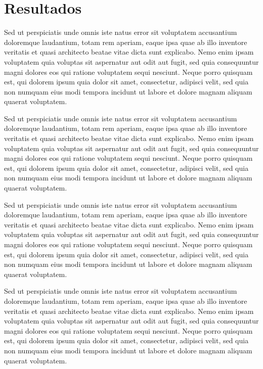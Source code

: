 \chapter{Resultados}


Sed ut perspiciatis unde omnis iste natus error sit voluptatem accusantium doloremque laudantium, totam rem aperiam, eaque ipsa quae ab illo inventore veritatis et quasi architecto beatae vitae dicta sunt explicabo. Nemo enim ipsam voluptatem quia voluptas sit aspernatur aut odit aut fugit, sed quia consequuntur magni dolores eos qui ratione voluptatem sequi nesciunt. Neque porro quisquam est, qui dolorem ipsum quia dolor sit amet, consectetur, adipisci velit, sed quia non numquam eius modi tempora incidunt ut labore et dolore magnam aliquam quaerat voluptatem.

Sed ut perspiciatis unde omnis iste natus error sit voluptatem accusantium doloremque laudantium, totam rem aperiam, eaque ipsa quae ab illo inventore veritatis et quasi architecto beatae vitae dicta sunt explicabo. Nemo enim ipsam voluptatem quia voluptas sit aspernatur aut odit aut fugit, sed quia consequuntur magni dolores eos qui ratione voluptatem sequi nesciunt. Neque porro quisquam est, qui dolorem ipsum quia dolor sit amet, consectetur, adipisci velit, sed quia non numquam eius modi tempora incidunt ut labore et dolore magnam aliquam quaerat voluptatem.

Sed ut perspiciatis unde omnis iste natus error sit voluptatem accusantium doloremque laudantium, totam rem aperiam, eaque ipsa quae ab illo inventore veritatis et quasi architecto beatae vitae dicta sunt explicabo. Nemo enim ipsam voluptatem quia voluptas sit aspernatur aut odit aut fugit, sed quia consequuntur magni dolores eos qui ratione voluptatem sequi nesciunt. Neque porro quisquam est, qui dolorem ipsum quia dolor sit amet, consectetur, adipisci velit, sed quia non numquam eius modi tempora incidunt ut labore et dolore magnam aliquam quaerat voluptatem.

Sed ut perspiciatis unde omnis iste natus error sit voluptatem accusantium doloremque laudantium, totam rem aperiam, eaque ipsa quae ab illo inventore veritatis et quasi architecto beatae vitae dicta sunt explicabo. Nemo enim ipsam voluptatem quia voluptas sit aspernatur aut odit aut fugit, sed quia consequuntur magni dolores eos qui ratione voluptatem sequi nesciunt. Neque porro quisquam est, qui dolorem ipsum quia dolor sit amet, consectetur, adipisci velit, sed quia non numquam eius modi tempora incidunt ut labore et dolore magnam aliquam quaerat voluptatem.

